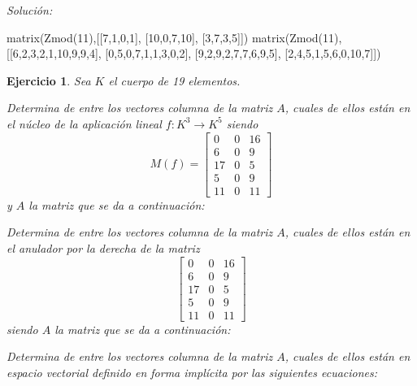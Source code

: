 \documentclass[12pt]{amsart}
\newtheorem{ejer}{Ejercicio}
\begin{document}
{\it Soluci\'on:}

\begin{sageblock}
matrix(Zmod(11),[[7,1,0,1],
[10,0,7,10],
[3,7,3,5]])
matrix(Zmod(11),[[6,2,3,2,1,10,9,9,4],
[0,5,0,7,1,1,3,0,2],
[9,2,9,2,7,7,6,9,5],
[2,4,5,1,5,6,0,10,7]])
\end{sageblock}



\begin{ejer} Sea $K$ el cuerpo de 19 elementos.
\newline
\noindent\begin{minipage}{\textwidth}
\begin{tcolorbox}[colback = green!20!white,title=Versión Núcleo]
Determina de entre los vectores columna de la matriz $A$, cuales de ellos están en el núcleo de la aplicación lineal $f:K^{3} \to K^{5}$ siendo  $$ M(f) = \left[\begin{array}{rrr}
0 & 0 & 16 \\
6 & 0 & 9 \\
17 & 0 & 5 \\
5 & 0 & 9 \\
11 & 0 & 11
\end{array}\right] $$ y $A$ la matriz que se da a continuación:\end{tcolorbox}
\end{minipage} \newline
\noindent\begin{minipage}{\textwidth}
\begin{tcolorbox}[colback = blue!20!white,title=Versión Anulador]
Determina de entre los vectores columna de la matriz $A$, cuales de ellos están en el anulador por la derecha de la matriz $$ \left[\begin{array}{rrr}
0 & 0 & 16 \\
6 & 0 & 9 \\
17 & 0 & 5 \\
5 & 0 & 9 \\
11 & 0 & 11
\end{array}\right] $$ siendo $A$ la matriz que se da a continuación:\end{tcolorbox}
\end{minipage} \newline
\noindent\begin{minipage}{\textwidth} 
\begin{tcolorbox}[colback = red!20!white,title=Versión Ecuaciones Implícitas]
Determina de entre los vectores columna de la matriz $A$, cuales de ellos están en espacio vectorial definido en forma implícita por las siguientes ecuaciones:

\end{tcolorbox}
\end{minipage}
\end{ejer}
\end{document}
